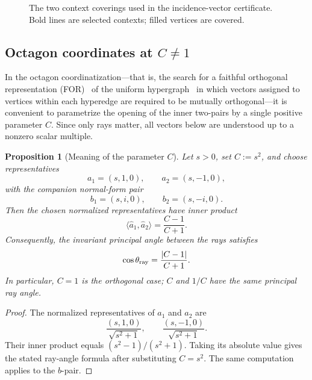 \documentclass[
  twocolumn,
  aps,
  pra,
  floatfix,
  amsmath,amssymb,
  longbibliography
]{revtex4-2}
\newtheorem{proposition}[theorem]{Proposition}
\theoremstyle{definition}
\theoremstyle{remark}
\begin{document}
\begin{figure}[t]

\caption{The two context coverings used in the incidence-vector certificate.
Bold lines are selected contexts; filled vertices are covered.}
\label{fig:octagon_coverings}
\end{figure}

\subsection{Octagon coordinates at \texorpdfstring{$C\neq1$}{C not equal to 1}}
\label{app:C}

In the octagon coordinatization---that is, the search for a faithful
orthogonal representation (FOR)~\cite{lovasz-79,Portillo-2015} of the uniform
hypergraph~\cite{Bretto-MR3077516} in which vectors assigned to
vertices within each hyperedge are required to be mutually orthogonal---it
is convenient to parametrize the opening of the inner two-pairs by a
single positive parameter \(C\).  Since only rays matter, all vectors
below are understood up to a nonzero scalar multiple.

\begin{proposition}[Meaning of the parameter \(C\)]
Let \(s>0\), set \(C:=s^2\), and choose representatives
\[
  a_1=(s,1,0),\qquad a_2=(s,-1,0),
\]
with the companion normal-form pair
\[
  b_1=(s,i,0),\qquad b_2=(s,-i,0).
\]
Then the chosen normalized representatives have inner product
\[
  \langle \widehat a_1,\widehat a_2\rangle=\frac{C-1}{C+1}.
\]
Consequently, the invariant principal angle between the rays satisfies
\[
 \cos\theta_{\rm ray}=\frac{|C-1|}{C+1}.
\]
In particular, \(C=1\) is the orthogonal case; $C$ and $1/C$ have the
same principal ray angle.
\end{proposition}

\begin{proof}
The normalized representatives of \(a_1\) and \(a_2\) are
\[
  \frac{(s,1,0)}{\sqrt{s^2+1}},
  \qquad
  \frac{(s,-1,0)}{\sqrt{s^2+1}} .
\]
Their inner product equals \((s^2-1)/(s^2+1)\).  Taking its absolute
value gives the stated ray-angle formula after substituting \(C=s^2\).
The same computation applies to the \(b\)-pair.
\end{proof}
\end{document}
